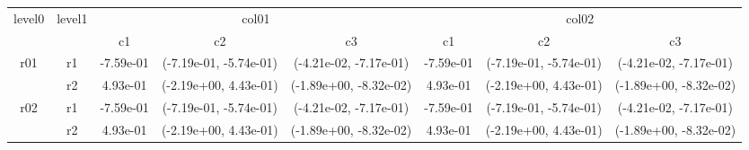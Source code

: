 \begin{tabular}{cccccccc}
\toprule
\multirow{2}{*}{level0} & \multirow{2}{*}{level1}&\multicolumn{3}{c}{col01}&\multicolumn{3}{c}{col02}\tabularnewline
\cmidrule(lr){3-5}
\cmidrule(lr){6-8}
&&c1&c2&c3&c1&c2&c3\tabularnewline
\midrule
\midrule
\multirow{2}{*}{r01}&r1&-7.59e-01& (-7.19e-01, -5.74e-01)& (-4.21e-02, -7.17e-01)&-7.59e-01& (-7.19e-01, -5.74e-01)& (-4.21e-02, -7.17e-01)\tabularnewline
&r2&4.93e-01& (-2.19e+00, 4.43e-01)& (-1.89e+00, -8.32e-02)&4.93e-01& (-2.19e+00, 4.43e-01)& (-1.89e+00, -8.32e-02)\tabularnewline
\midrule
\multirow{2}{*}{r02}&r1&-7.59e-01& (-7.19e-01, -5.74e-01)& (-4.21e-02, -7.17e-01)&-7.59e-01& (-7.19e-01, -5.74e-01)& (-4.21e-02, -7.17e-01)\tabularnewline
&r2&4.93e-01& (-2.19e+00, 4.43e-01)& (-1.89e+00, -8.32e-02)&4.93e-01& (-2.19e+00, 4.43e-01)& (-1.89e+00, -8.32e-02)\tabularnewline
\bottomrule
\end{tabular}
